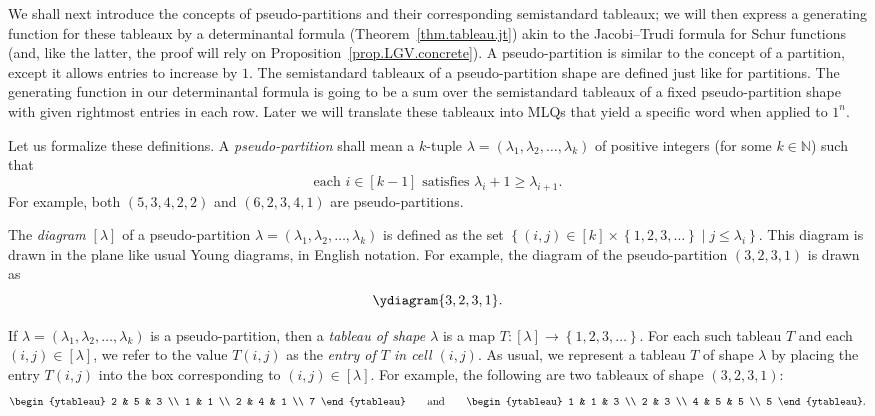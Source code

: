 \documentclass[reqno]{amsart}
\newcommand{\0}{\phantom{c}}
\newcommand{\diag}[1]{\left[#1\right]} %
\newcommand{\NN}{\mathbb{N}}
\newenvironment{verlong}{}{}
\newcommand{\set}[1]{\left\{ #1 \right\}}
\newcommand{\tup}[1]{\left( #1 \right)}
\newcommand{\ive}[1]{\left[ #1 \right]}
\newcommand{\defn}[1]{{\color{darkred}\emph{#1}}} %
\theoremstyle{plain}
\theoremstyle{definition}
\numberwithin{equation}{section}
\begin{document}
We shall next introduce the concepts of pseudo-partitions and their corresponding semistandard tableaux;
we will then express a generating function for these tableaux by a determinantal formula (Theorem~\ref{thm.tableau.jt}) akin to the Jacobi--Trudi formula for Schur functions (and, like the latter, the proof will rely on Proposition~\ref{prop.LGV.concrete}).
A pseudo-partition is similar to the concept of a partition, except it allows entries to increase by $1$.
The semistandard tableaux of a pseudo-partition shape are defined just like for partitions.
The generating function in our determinantal formula is going to be a sum over the semistandard tableaux of a fixed pseudo-partition shape with given rightmost entries in each row.
Later we will translate these tableaux into MLQs that yield a specific word when applied to $1^n$.

Let us formalize these definitions.
A \defn{pseudo-partition} shall mean a $k$-tuple $\lambda = \tup{\lambda_1, \lambda_2, \dotsc, \lambda_k}$ of positive integers (for some $k \in \NN$) such that
\[
\text{each } i \in \ive{k-1} \text{ satisfies } \lambda_i + 1 \geq \lambda_{i+1}.
\]
For example, both $\tup{5,3,4,2,2}$ and $\tup{6,2,3,4,1}$ are pseudo-partitions.

The \defn{diagram $\diag{\lambda}$} of a pseudo-partition $\lambda = \tup{\lambda_1, \lambda_2, \dotsc,\lambda_k}$ is defined as the set
$\set{  \left(  i,j\right)  \in \ive{k} \times \set{ 1,2,3,\ldots }  \mid  j \leq \lambda_i }$.
This diagram is drawn in the plane like usual Young diagrams, in English notation.
\begin{verlong}
For example, the diagram of the pseudo-partition $\tup{3,2,3,1}$ is drawn as
\[
\ydiagram{3,2,3,1}.
\]
\end{verlong}

If $\lambda = \tup{\lambda_1, \lambda_2, \dotsc, \lambda_k}$ is a pseudo-partition, then a \defn{tableau of shape $\lambda$} is a map $T \colon \diag{\lambda} \to \set{1,2,3,\ldots}$.
For each such tableau $T$ and each $(i,j) \in \diag{\lambda}$, we refer to the value $T(i,j)$ as the \defn{entry of $T$ in cell $\left(i,j\right)$}.
As usual, we represent a tableau $T$ of shape $\lambda$ by placing the entry $T(i,j)$ into the box corresponding to $(i,j) \in \diag{\lambda}$.
\begin{verlong}
For example, the following are two tableaux of shape $\tup{3,2,3,1}$:
\begin{equation}
\label{eq.tableau.exas-long}
\begin{ytableau} 2 & 5 & 3 \\ 1 & 1 \\ 2 & 4 & 1 \\ 7 \end{ytableau}\qquad
\text{and}\qquad
\begin{ytableau} 1 & 1 & 3 \\ 2 & 3 \\ 4 & 5 & 5 \\ 5 \end{ytableau}.
\end{equation}
\end{verlong}
\end{document}
